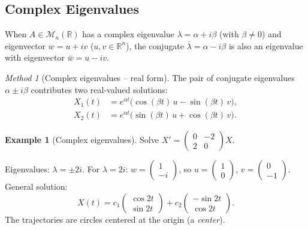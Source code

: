 \documentclass[12pt,a4paper,openany]{book}
\theoremstyle{definition}
\newtheorem{example}[definition]{Example}
\theoremstyle{plain}
\theoremstyle{remark}
\newtheorem{method}[definition]{Method}
\newcommand{\R}{\mathbb{R}}
\begin{document}
\subsection{Complex Eigenvalues}\label{subsec:complex-eigenvalues}

When $A\in\mathcal{M}_n(\R)$ has a complex eigenvalue
$\lambda=\alpha+i\beta$ (with $\beta\neq 0$) and eigenvector
$w = u + iv$ ($u,v\in\R^n$), the conjugate $\bar\lambda = \alpha-i\beta$
is also an eigenvalue with eigenvector $\bar w = u-iv$.

\begin{method}[Complex eigenvalues -- real form]\label{meth:complex-eigen}
The pair of conjugate eigenvalues $\alpha\pm i\beta$ contributes
two real-valued solutions:
\begin{equation}\label{eq:sol-complex-real}
\begin{aligned}
  X_1(t) &= e^{\alpha t}\bigl(\cos(\beta t)\,u - \sin(\beta t)\,v\bigr),\\
  X_2(t) &= e^{\alpha t}\bigl(\sin(\beta t)\,u + \cos(\beta t)\,v\bigr).
\end{aligned}
\end{equation}
\end{method}

\begin{example}[Complex eigenvalues]\label{ex:complex-eigenvalues}
Solve $X' = \begin{pmatrix} 0 & -2 \\ 2 & 0 \end{pmatrix}X$.

Eigenvalues: $\lambda = \pm 2i$.
For $\lambda = 2i$: $w = \begin{pmatrix}1\\-i\end{pmatrix}$, so
$u = \begin{pmatrix}1\\0\end{pmatrix}$,
$v = \begin{pmatrix}0\\-1\end{pmatrix}$.
General solution:
\[
  X(t) = c_1\begin{pmatrix}\cos 2t\\\sin 2t\end{pmatrix}
        + c_2\begin{pmatrix}-\sin 2t\\\cos 2t\end{pmatrix}.
\]
The trajectories are circles centered at the origin (a \emph{center}).
\end{example}
\end{document}
